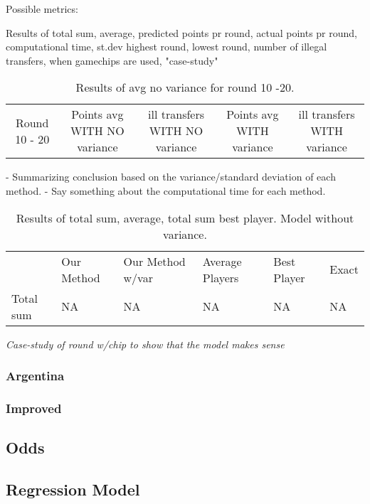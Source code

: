 Possible metrics: 

Results of total sum, average, predicted points pr round, actual points pr round, computational time, st.dev highest round, lowest round, number of illegal transfers, when gamechips are used, "case-study"



\begin{table}[H]
    \centering
    \begin{tabular}{c|c|c|c|c}
        Round 10 - 20 & Points avg WITH NO variance & ill transfers WITH NO variance & Points avg WITH variance & ill transfers WITH variance\\
    \end{tabular}
    \caption{Results of avg no variance for round 10 -20.}
\end{table}

- Summarizing conclusion based on the variance/standard deviation of each method.
- Say something about the computational time for each method. 

\begin{table}[H]
\centering
\caption{Results of total sum, average, total sum best player. Model without variance.}
\begin{tabular}{llllll}
& Our Method & Our Method w/var  & Average Players & Best Player & Exact\\
Total sum  & NA  & NA & NA & NA & NA \\
\end{tabular}
\end{table}



\textit{Case-study of round w/chip to show that the model makes sense}

\subsubsection{Argentina}



\subsubsection{Improved}


\subsection{Odds}
\subsection{Regression Model}
